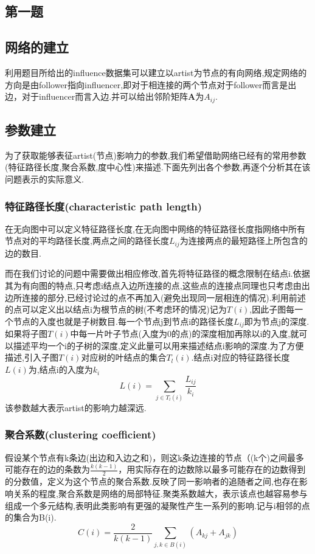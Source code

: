 \documentclass[a4paper,12pt]{article}
\newcommand{\wuhao}{\fontsize{10.5pt}{\baselineskip}\selectfont}
\begin{document}
	\begin{spacing}{1.2}
		\wuhao
		\section{第一题}
		\subsection{网络的建立}
		利用题目所给出的influence数据集可以建立以artist为节点的有向网络,规定网络的方向是由follower指向influencer,即对于相连接的两个节点对于follower而言是出边，对于influencer而言入边.并可以给出邻阶矩阵$\bm{A}$为$A_{ij}$.
		\subsection{参数建立}
		为了获取能够表征artist(节点)影响力的参数,我们希望借助网络已经有的常用参数(特征路径长度,聚合系数,度中心性)来描述.下面先列出各个参数,再逐个分析其在该问题表示的实际意义.
		\subsubsection{特征路径长度(characteristic path length)}
		在无向图中可以定义特征路径长度,在无向图中网络的特征路径长度指网络中所有节点对的平均路径长度,两点之间的路径长度$L_{ij}$为连接两点的最短路径上所包含的边的数目.
		\par
		而在我们讨论的问题中需要做出相应修改,首先将特征路径的概念限制在结点i.依据其为有向图的特点,只考虑i结点入边所连接的点,这些点的连接点同理也只考虑由出边所连接的部分,已经讨论过的点不再加入(避免出现同一层相连的情况).利用前述的点可以定义出以结点i为根节点的树(不考虑环的情况)记为$T(i)$,因此子图每一个节点的入度也就是子树数目.每一个节点j到节点i的路径长度$L_{ij}$即为节点j的深度.如果将子图$T(i)$中每一片叶子节点(入度为0的点)的深度相加再除以i的入度,就可以描述平均一个i的子树的深度,定义此量可以用来描述结点i影响的深度.为了方便描述,引入子图$T(i)$对应树的叶结点的集合$T_{l}(i)$.结点i对应的特征路径长度$L(i)$为,结点i的入度为$k_{i}$
		$$
		L(i)=\sum\limits_{j\in T_{l}(i)}\frac{L_{ij}}{k_{i}}
		$$
		该参数越大表示artist的影响力越深远.
		\subsubsection{聚合系数(clustering coefficient)}
		假设某个节点有k条边(出边和入边之和)，则这k条边连接的节点（(k个)之间最多可能存在的边的条数为$\frac{k(k−1)}{2}$，用实际存在的边数除以最多可能存在的边数得到的分数值，定义为这个节点的聚合系数.反映了同一影响者的追随者之间,也存在影响关系的程度,聚合系数是网络的局部特征.聚类系数越大，表示该点也越容易参与组成一个多元结构,表明此类影响有更强的凝聚性产生一系列的影响.记与i相邻的点的集合为B(i).
		$$C(i)=\frac{2}{k(k-1)}\sum\limits_{j,k\in B(i)}(A_{kj}+A_{jk})$$

\end{spacing}
\end{document}
